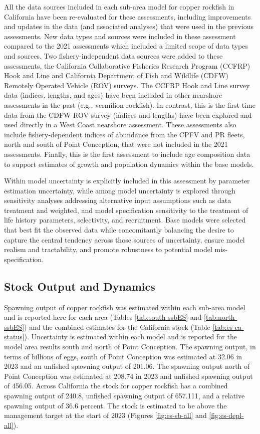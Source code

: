 \documentclass[11pt,
  english,
  letterpaper,
]{article}
\begin{document}
All the data sources included in each sub-area model for copper rockfish in California have been re-evaluated for these assessments, including improvements and updates in the data (and associated analyses) that were used in the previous assessments. New data types and sources were included in these assessment compared to the 2021 assessments which included a limited scope of data types and sources. Two fishery-independent data sources were added to these assessments, the California Collaborative Fisheries Research Program (CCFRP) Hook and Line and California Department of Fish and Wildlife (CDFW) Remotely Operated Vehicle (ROV) surveys. The CCFRP Hook and Line survey data (indices, lengths, and ages) have been included in other nearshore assessments in the past (e.g., vermilion rockfish). In contrast, this is the first time data from the CDFW ROV survey (indices and lengths) have been explored and used directly in a West Coast nearshore assessment. These assessments also include fishery-dependent indices of abundance from the CPFV and PR fleets, north and south of Point Conception, that were not included in the 2021 assessments. Finally, this is the first assessment to include age composition data to support estimates of growth and population dynamics within the base models.

Within model uncertainty is explicitly included in this assessment by parameter estimation uncertainty, while among model uncertainty is explored through sensitivity analyses addressing alternative input assumptions such as data treatment and weighted, and model specification sensitivity to the treatment of life history parameters, selectivity, and recruitment. Base models were selected that best fit the observed data while concomitantly balancing the desire to capture the central tendency across those sources of uncertainty, ensure model realism and tractability, and promote robustness to potential model mis-specification.

\hypertarget{stock-output-and-dynamics}{%
\subsection*{Stock Output and Dynamics}\label{stock-output-and-dynamics}}

Spawning output of copper rockfish was estimated within each sub-area model and is reported here for each area (Tables \ref{tab:south-ssbES} and \ref{tab:north-ssbES}) and the combined estimates for the California stock (Table \ref{tab:es-ca-status}). Uncertainty is estimated within each model and is reported for the model area results south and north of Point Conception. The spawning output, in terms of billions of eggs, south of Point Conception was estimated at 32.06 in 2023 and an unfished spawning output of 201.06. The spawning output north of Point Conception was estimated at 208.74 in 2023 and unfished spawning output of 456.05. Across California the stock for copper rockfish has a combined spawning output of 240.8, unfished spawning output of 657.111, and a relative spawning output of 36.6 percent. The stock is estimated to be above the management target at the start of 2023 (Figures \ref{fig:es-sb-all} and \ref{fig:es-depl-all}).
\end{document}
